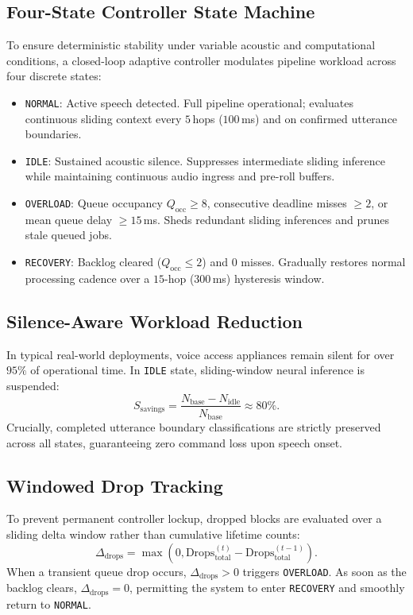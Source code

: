 \documentclass[10pt,twocolumn,letterpaper]{article}
\begin{document}
\subsection{Four-State Controller State Machine}

To ensure deterministic stability under variable acoustic and computational conditions, a closed-loop adaptive controller modulates pipeline workload across four discrete states:
\begin{itemize}
    \item \texttt{NORMAL}: Active speech detected. Full pipeline operational; evaluates continuous sliding context every $5$\,hops ($100$\,ms) and on confirmed utterance boundaries.
    \item \texttt{IDLE}: Sustained acoustic silence. Suppresses intermediate sliding inference while maintaining continuous audio ingress and pre-roll buffers.
    \item \texttt{OVERLOAD}: Queue occupancy $Q_{\text{occ}} \ge 8$, consecutive deadline misses $\ge 2$, or mean queue delay $\ge 15$\,ms. Sheds redundant sliding inferences and prunes stale queued jobs.
    \item \texttt{RECOVERY}: Backlog cleared ($Q_{\text{occ}} \le 2$) and $0$ misses. Gradually restores normal processing cadence over a $15$-hop ($300$\,ms) hysteresis window.
\end{itemize}

\subsection{Silence-Aware Workload Reduction}

In typical real-world deployments, voice access appliances remain silent for over $95\%$ of operational time. In \texttt{IDLE} state, sliding-window neural inference is suspended:
\begin{equation}
    S_{\text{savings}} = \frac{N_{\text{base}} - N_{\text{idle}}}{N_{\text{base}}} \approx 80\%.
\end{equation}
Crucially, completed utterance boundary classifications are strictly preserved across all states, guaranteeing zero command loss upon speech onset.

\subsection{Windowed Drop Tracking}

To prevent permanent controller lockup, dropped blocks are evaluated over a sliding delta window rather than cumulative lifetime counts:
\begin{equation}
    \Delta_{\text{drops}} = \max\left(0, \text{Drops}_{\text{total}}^{(t)} - \text{Drops}_{\text{total}}^{(t-1)}\right).
\end{equation}
When a transient queue drop occurs, $\Delta_{\text{drops}} > 0$ triggers \texttt{OVERLOAD}. As soon as the backlog clears, $\Delta_{\text{drops}} = 0$, permitting the system to enter \texttt{RECOVERY} and smoothly return to \texttt{NORMAL}.
\end{document}
